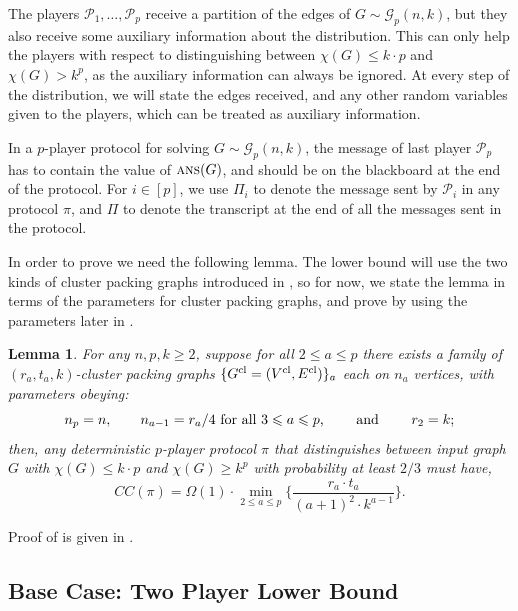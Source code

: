 \documentclass[11pt]{article}
\newtheorem{lemma}{Lemma}[section]
\theoremstyle{definition}
\renewcommand{\leq}{\leqslant}
\renewcommand{\geq}{\geqslant}
\newcommand{\chrom}{\ensuremath{\chi}}
\newcommand{\player}[1]{\ensuremath{\mathcal{P}_{#1}}}
\newcommand{\cG}{\ensuremath{\mathcal{G}}}
\newcommand{\ans}{\ensuremath{\textnormal{\textsc{ans}}}}
\newcommand{\prot}{\ensuremath{\pi}}
\newcommand{\Prot}{\ensuremath{\Pi}}
\begin{document}
The players $\player{1},\ldots, \player{p}$ receive a partition of the edges of $G \sim \cG_p(n,k)$, but they also receive some auxiliary information about the distribution. This can only help the players with respect to distinguishing between $\chrom(G) \leq k \cdot p$ and $\chrom(G) > k^p$, as the auxiliary information can always be ignored. At every step of the distribution, we will state the edges received, and any other random variables given to the players, which can be treated as auxiliary information.

In a $p$-player protocol for solving $G \sim \cG_p(n,k)$, the message of last player $\player{p}$ has to contain the value of $\ans(G)$, and should be on the blackboard at the end of the protocol. For $i \in [p]$, we use $\Prot_i$ to denote the message sent by $\player{i}$ in any protocol $\prot$, and $\Prot$ to denote the transcript at the end of all the messages sent in the protocol. 

 
In order to prove  we need the following lemma.
The lower bound will use the two kinds of cluster packing graphs introduced in , so for now, we state the lemma in terms of the parameters for cluster packing graphs, and prove  by using the parameters later in . 

\begin{lemma}\label{lem:adv-lb-cluster}
For any $n, p, k \geq 2$, suppose for all $2 \leq a \leq p$ there exists a family of $(r_a, t_a, k)$-cluster packing graphs $\{G^{\textnormal{cl}} = (V^{\textnormal{cl}}, E^{\textnormal{cl}})\}_{a}$ each on $n_a$ vertices, with parameters obeying:
\begin{equation}\label{eq:params-all}
	n_p = n, \qquad n_{a-1} = r_a/4 \textnormal{ for all $3 \leq a \leq p$,} \qquad \textnormal{ and }\qquad r_2 = k;
\end{equation}
then, any deterministic $p$-player protocol $\prot$ that distinguishes between input graph $G$ with $\chrom(G) \leq k \cdot p$ and $\chrom(G) \geq k^p$ with probability at least $2/3$ must have,
\[
CC(\prot)  = 	\Omega(1) \cdot\underset{2 \leq a \leq p}{\min}\Big \{ \frac{r_a \cdot t_a}{(a+1)^2 \cdot k^{a-1}}\Big\}.
\]
\end{lemma}
Proof of  is given in .
	

	
\subsection{Base Case: Two Player Lower Bound}\label{subsec:adv-basecase}
\end{document}
